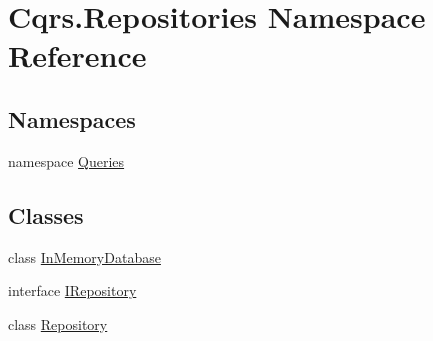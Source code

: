 \hypertarget{namespaceCqrs_1_1Repositories}{}\section{Cqrs.\+Repositories Namespace Reference}
\label{namespaceCqrs_1_1Repositories}
\subsection*{Namespaces}
\begin{DoxyCompactItemize}
\item 
namespace \hyperlink{namespaceCqrs_1_1Repositories_1_1Queries}{Queries}
\end{DoxyCompactItemize}
\subsection*{Classes}
\begin{DoxyCompactItemize}
\item 
class \hyperlink{classCqrs_1_1Repositories_1_1InMemoryDatabase}{In\+Memory\+Database}
\item 
interface \hyperlink{interfaceCqrs_1_1Repositories_1_1IRepository}{I\+Repository}
\item 
class \hyperlink{classCqrs_1_1Repositories_1_1Repository}{Repository}
\end{DoxyCompactItemize}
